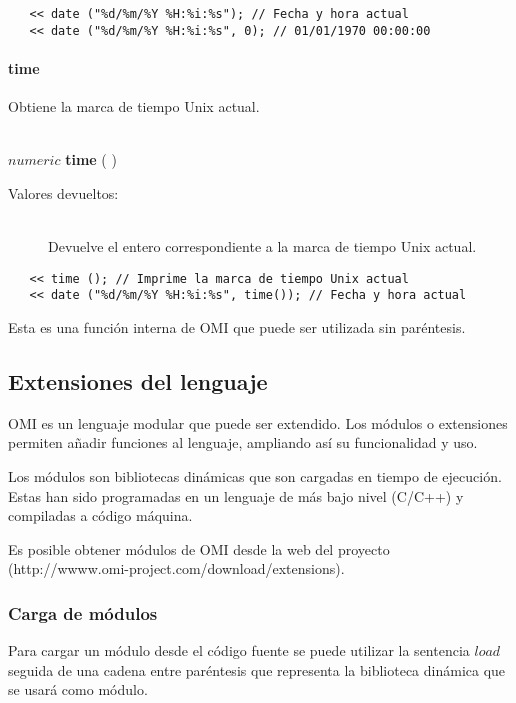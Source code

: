 \begin{lstlisting}  
   << date ("%d/%m/%Y %H:%i:%s"); // Fecha y hora actual
   << date ("%d/%m/%Y %H:%i:%s", 0); // 01/01/1970 00:00:00
\end{lstlisting}


\paragraph{time}
Obtiene la marca de tiempo Unix actual.  

\begin{framed}
\hfill \\ $numeric$ \textbf{time} ( )  
\begin{description}
\item[Valores devueltos:] \hfill \\
   Devuelve el entero correspondiente a la marca de tiempo Unix actual.
\end{description}
\end{framed}

\begin{lstlisting}  
   << time (); // Imprime la marca de tiempo Unix actual
   << date ("%d/%m/%Y %H:%i:%s", time()); // Fecha y hora actual 
\end{lstlisting}

Esta es una función interna de OMI que puede ser utilizada sin paréntesis.

\subsection{Extensiones del lenguaje}
OMI es un lenguaje modular que puede ser extendido. 
Los módulos o extensiones permiten añadir funciones al lenguaje, ampliando así su funcionalidad y uso.

Los módulos son bibliotecas dinámicas que son cargadas en tiempo de ejecución. Estas
han sido programadas en un lenguaje de más bajo nivel (C/C++) y compiladas a código máquina. 

Es posible obtener módulos de OMI desde la web del proyecto 
(http://wwww.omi-project.com/download/extensions). 

\subsubsection{Carga de módulos}
Para cargar un módulo desde el código fuente se puede utilizar la sentencia $load$ seguida de 
una cadena entre paréntesis que representa la biblioteca dinámica que se usará como módulo. \\

